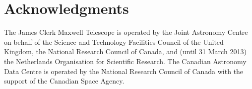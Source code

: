 \documentclass[final,authoryear,5p,times,twocolumn]{elsarticle}
\begin{document}
\section*{Acknowledgments}

The James Clerk Maxwell Telescope is operated by the Joint Astronomy
Centre on behalf of the Science and Technology Facilities Council of
the United Kingdom, the National Research Council of Canada, and
(until 31 March 2013) the Netherlands Organisation for Scientific
Research.  The Canadian Astronomy Data Centre is operated by the
National Research Council of Canada with the support of the Canadian
Space Agency.

\end{document}
